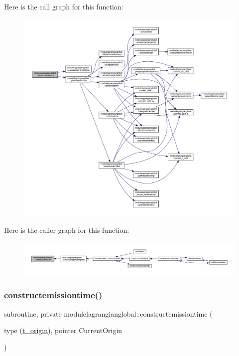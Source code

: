 Here is the call graph for this function\+:\nopagebreak
\begin{figure}[H]
\begin{center}
\leavevmode
\includegraphics[width=350pt]{namespacemodulelagrangianglobal_a19776a2b14eca267eac2af7e53ce5c77_cgraph}
\end{center}
\end{figure}
Here is the caller graph for this function\+:\nopagebreak
\begin{figure}[H]
\begin{center}
\leavevmode
\includegraphics[width=350pt]{namespacemodulelagrangianglobal_a19776a2b14eca267eac2af7e53ce5c77_icgraph}
\end{center}
\end{figure}
\mbox{\label{namespacemodulelagrangianglobal_a13d67d5bfe97a6d21e41748215a9fd5c}} 
\subsubsection{\texorpdfstring{constructemissiontime()}{constructemissiontime()}}
{\footnotesize\ttfamily subroutine, private modulelagrangianglobal\+::constructemissiontime (\begin{DoxyParamCaption}\item[{type (\mbox{\hyperlink{structmodulelagrangianglobal_1_1t__origin}{t\+\_\+origin}}), pointer}]{Current\+Origin }\end{DoxyParamCaption})\hspace{0.3cm}{\ttfamily [private]}}

